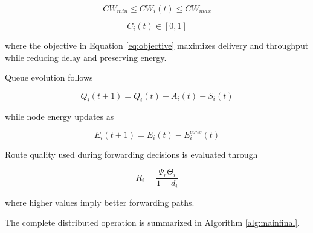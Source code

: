 \documentclass[a4paper,fleqn,final,1p]{cas-dc}
\numberwithin{equation}{section}
\begin{document}
\begin{equation}
CW_{min}\le CW_i(t)\le CW_{max}
\label{eq:const2}
\end{equation}

\begin{equation}
C_i(t)\in[0,1]
\label{eq:const3}
\end{equation}

where the objective in Equation \ref{eq:objective} maximizes delivery and throughput while reducing delay and preserving energy.

Queue evolution follows

\begin{equation}
Q_i(t+1)=
Q_i(t)+A_i(t)-S_i(t)
\label{eq:queuefinal}
\end{equation}

while node energy updates as

\begin{equation}
E_i(t+1)=
E_i(t)-E_i^{cons}(t)
\label{eq:energyfinal}
\end{equation}

Route quality used during forwarding decisions is evaluated through

\begin{equation}
R_i=
\frac{\Psi_r \Theta_i}
{1+d_i}
\label{eq:routequality}
\end{equation}

where higher values imply better forwarding paths.

The complete distributed operation is summarized in Algorithm \ref{alg:mainfinal}.
\end{document}
